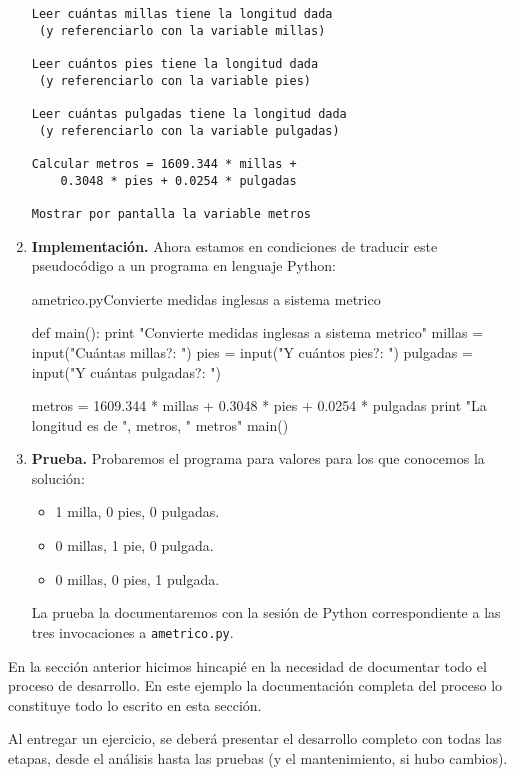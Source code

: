 \begin{enumerate}
\begin{verbatim}
Leer cuántas millas tiene la longitud dada
 (y referenciarlo con la variable millas)

Leer cuántos pies tiene la longitud dada
 (y referenciarlo con la variable pies)

Leer cuántas pulgadas tiene la longitud dada
 (y referenciarlo con la variable pulgadas)

Calcular metros = 1609.344 * millas +
    0.3048 * pies + 0.0254 * pulgadas

Mostrar por pantalla la variable metros
\end{verbatim}

\item {\bf Implementación.} Ahora estamos en condiciones de
traducir este pseudocódigo a un programa en lenguaje Python:

\begin{codigo}{ametrico.py}{Convierte medidas inglesas a sistema metrico}
\begin{codigo-python}
def main():
      print "Convierte medidas inglesas a sistema metrico"
      millas = input("Cuántas millas?: ")
      pies = input("Y cuántos pies?: ")
      pulgadas = input("Y cuántas pulgadas?: ")

      metros = 1609.344 * millas + 0.3048 * pies + 0.0254 * pulgadas
      print "La longitud es de ", metros, " metros"
main()
\end{codigo-python}
\end{codigo}

\item {\bf Prueba.} Probaremos el programa para valores para los que conocemos
la solución:

\begin{itemize}
\item 1 milla, 0 pies, 0 pulgadas.
\item 0 millas, 1 pie, 0 pulgada.
\item 0 millas, 0 pies, 1 pulgada.
\end{itemize}

La prueba la documentaremos con la sesión de Python
correspondiente a las tres invocaciones a \lstinline!ametrico.py!.
\end{enumerate}

En la sección anterior hicimos hincapié en la necesidad de
documentar todo el proceso de desarrollo. En este ejemplo la
documentación completa del proceso lo constituye todo lo escrito
en esta sección.

\begin{atencion}
Al entregar un ejercicio, se deberá presentar el desarrollo completo con
todas las etapas, desde el análisis hasta las pruebas (y el mantenimiento, si
hubo cambios).
\end{atencion}

